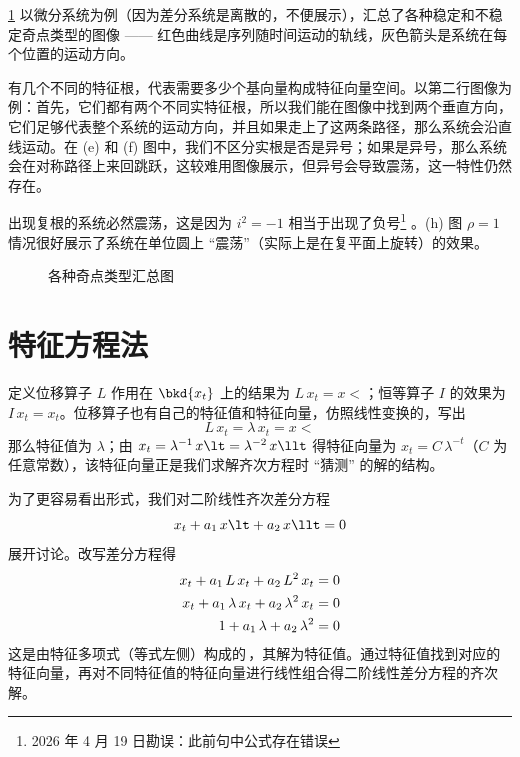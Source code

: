 \ref{fig:Sing} 以微分系统为例（因为差分系统是离散的，不便展示），汇总了各种稳定和不稳定奇点类型的图像 —— 红色曲线是序列随时间运动的轨线，灰色箭头是系统在每个位置的运动方向。

有几个不同的特征根，代表需要多少个基向量构成特征向量空间。以第二行图像为例：首先，它们都有两个不同实特征根，所以我们能在图像中找到两个垂直方向，它们足够代表整个系统的运动方向，并且如果走上了这两条路径，那么系统会沿直线运动。在 (e) 和 (f) 图中，我们不区分实根是否是异号；如果是异号，那么系统会在对称路径上来回跳跃，这较难用图像展示，但异号会导致震荡，这一特性仍然存在。

出现复根的系统必然震荡，这是因为 \(i^2=-1\) 相当于出现了负号\footnote{2026 年 4 月 19 日勘误：此前句中公式存在错误} 。(h) 图 \(\rho=1\) 情况很好展示了系统在单位圆上 “震荡”（实际上是在复平面上旋转）的效果。

\begin{figure}[H]
  \caption{各种奇点类型汇总图}
  \label{fig:Sing}
\end{figure}


\BeginChapterAppendix

\section{特征方程法}{\label{sec:CharEquMethod}}

定义位移算子 \(L\) 作用在 \(\bkd{x_t}\) 上的结果为 \(L\,x_t = x\lt\)；恒等算子 \(I\) 的效果为 \(I \, x_t=x_t\)。位移算子也有自己的特征值和特征向量，仿照线性变换的，写出
\begin{equation}
    L\,x_t=\lambda\,x_t=x\lt
\end{equation}
那么特征值为 \(\lambda\)；由 \(x_t=\lambda^{-1}\,x\lt=\lambda^{-2}\,x\llt\) 得特征向量为 \(x_t=C\,\lambda^{-t}\)（\(C\) 为任意常数），该特征向量正是我们求解齐次方程时 “猜测” 的解的结构。

为了更容易看出形式，我们对二阶线性齐次差分方程
\begin{equation}
    x_t + a_1\,x\lt + a_2\,x\llt=0
\end{equation}
展开讨论。改写差分方程得
\begin{align}
    x_t + a_1\,L\,x_t + a_2\,L^2\,x_t &= 0\notag\\
    x_t + a_1\,\lambda\,x_t + a_2\,\lambda^2\,x_t &= 0\notag\\
    1 + a_1\,\lambda + a_2\,\lambda^2 &= 0
\end{align}
这是由特征多项式（等式左侧）构成的\,，其解为特征值。通过特征值找到对应的特征向量，再对不同特征值的特征向量进行线性组合得二阶线性差分方程的齐次解。

